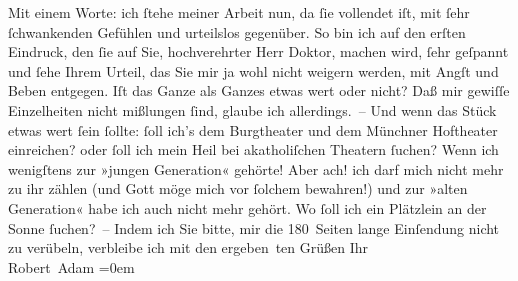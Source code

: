 \begin{ledgroupsized}[t]{13cm}
                    Mit einem Worte: ich ſtehe meiner Arbeit nun, da ſie vollendet iſt, mit ſehr
                    ſchwankenden Gefühlen und urteilslos gegenüber.\pend
           \pstart
           So bin ich auf den erſten Eindruck, den ſie auf Sie, hochverehrter Herr Doktor,
                    machen wird, ſehr geſpannt und ſehe Ihrem Urteil, das Sie mir ja wohl nicht
                    weigern werden, mit Angſt und Beben entgegen. Iſt das Ganze als Ganzes etwas
                    wert oder nicht? Daß mir gewiſſe Einzelheiten nicht mißlungen ſind, glaube ich
                    allerdings. –\pend
           \pstart
           Und wenn das Stück etwas wert {\pb}ſein ſollte: ſoll
                    ich’s dem Burgtheater und dem Münchner Hoftheater einreichen? oder ſoll ich mein Heil bei
                    akatholiſchen Theatern ſuchen?\pend
           \pstart
           Wenn ich wenigſtens zur »jungen Generation« gehörte! Aber ach! ich darf mich
                    nicht mehr zu ihr zählen (und Gott möge mich vor ſolchem bewahren!) und zur
                    »alten Generation« habe ich auch nicht mehr gehört. Wo ſoll ich ein Plätzlein an
                    der Sonne ſuchen? –\pend
           \pstart
           Indem ich Sie bitte, mir die 180 Seiten lange Einſendung nicht zu verübeln,
                    verbleibe ich mit den ergeben ten Grüßen Ihr{\\[\baselineskip]}\spacefill\mbox{Robert Adam}\pend
           \leftskip=0em{}
         
         \endnumbering{}\end{ledgroupsized}  \newcommand{\dateiname}{L02275}\newcommand{\titel}{Robert Adam an Arthur Schnitzler, 12. 10. 1917}\newcommand{\editorInnen}{Martin Anton Müller und Gerd-Hermann Susen}
      